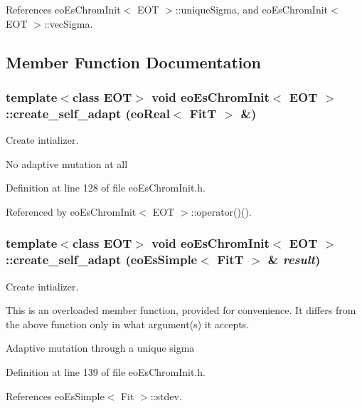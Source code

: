References eo\-Es\-Chrom\-Init$<$ EOT $>$::unique\-Sigma, and eo\-Es\-Chrom\-Init$<$ EOT $>$::vec\-Sigma.

\subsection{Member Function Documentation}
\subsubsection{\setlength{\rightskip}{0pt plus 5cm}template$<$class EOT$>$ void {\bf eo\-Es\-Chrom\-Init}$<$ {\bf EOT} $>$::create\_\-self\_\-adapt ({\bf eo\-Real}$<$ Fit\-T $>$ \&)\hspace{0.3cm}{\tt  [inline, private]}}\label{classeo_es_chrom_init_d0}


Create intializer. 

No adaptive mutation at all 

Definition at line 128 of file eo\-Es\-Chrom\-Init.h.

Referenced by eo\-Es\-Chrom\-Init$<$ EOT $>$::operator()().
\subsubsection{\setlength{\rightskip}{0pt plus 5cm}template$<$class EOT$>$ void {\bf eo\-Es\-Chrom\-Init}$<$ {\bf EOT} $>$::create\_\-self\_\-adapt ({\bf eo\-Es\-Simple}$<$ Fit\-T $>$ \& {\em result})\hspace{0.3cm}{\tt  [inline, private]}}\label{classeo_es_chrom_init_d1}


Create intializer. 

This is an overloaded member function, provided for convenience. It differs from the above function only in what argument(s) it accepts.

Adaptive mutation through a unique sigma 

Definition at line 139 of file eo\-Es\-Chrom\-Init.h.

References eo\-Es\-Simple$<$ Fit $>$::stdev.
